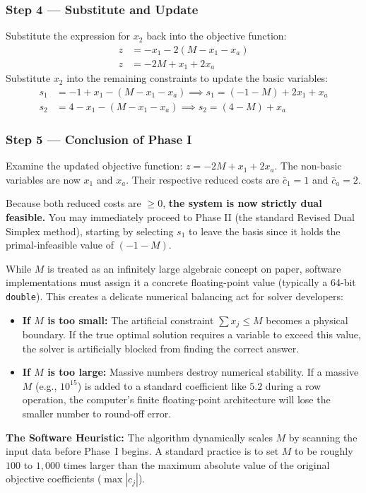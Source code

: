 \documentclass[11pt, a4paper]{article}
\begin{document}
\begin{example}
\subsubsection*{Step 4 --- Substitute and Update}
Substitute the expression for $x_2$ back into the objective function:
\begin{align*}
z &= -x_1 - 2(M - x_1 - x_a) \\
z &= -2M + x_1 + 2x_a
\end{align*}
Substitute $x_2$ into the remaining constraints to update the basic variables:
\begin{align*}
s_1 &= -1 + x_1 - (M - x_1 - x_a) \implies s_1 = (-1 - M) + 2x_1 + x_a \\
s_2 &= 4 - x_1 - (M - x_1 - x_a) \implies s_2 = (4 - M) + x_a
\end{align*}

\subsubsection*{Step 5 --- Conclusion of Phase I}
Examine the updated objective function: $z = -2M + x_1 + 2x_a$. 
The non-basic variables are now $x_1$ and $x_a$. Their respective reduced costs are $\bar{c}_1 = 1$ and $\bar{c}_a = 2$. 

Because both reduced costs are $\ge 0$, \textbf{the system is now strictly dual feasible.} You may immediately proceed to Phase II (the standard Revised Dual Simplex method), starting by selecting $s_1$ to leave the basis since it holds the primal-infeasible value of $(-1 - M)$.
\end{example}

\begin{note}
While $M$ is treated as an infinitely large algebraic concept on paper, software implementations must assign it a concrete floating-point value (typically a 64-bit \texttt{double}). This creates a delicate numerical balancing act for solver developers:
\begin{itemize}[itemsep=2pt]
    \item \textbf{If $M$ is too small:} The artificial constraint $\sum x_j \le M$ becomes a physical boundary. If the true optimal solution requires a variable to exceed this value, the solver is artificially blocked from finding the correct answer.
    \item \textbf{If $M$ is too large:} Massive numbers destroy numerical stability. If a massive $M$ (e.g., $10^{15}$) is added to a standard coefficient like $5.2$ during a row operation, the computer's finite floating-point architecture will lose the smaller number to round-off error.
\end{itemize}

\textbf{The Software Heuristic:} The algorithm dynamically scales $M$ by scanning the input data before Phase~I begins. A standard practice is to set $M$ to be roughly $100$ to $1{,}000$ times larger than the maximum absolute value of the original objective coefficients ($\max |c_j|$).
\end{note}
\end{document}

